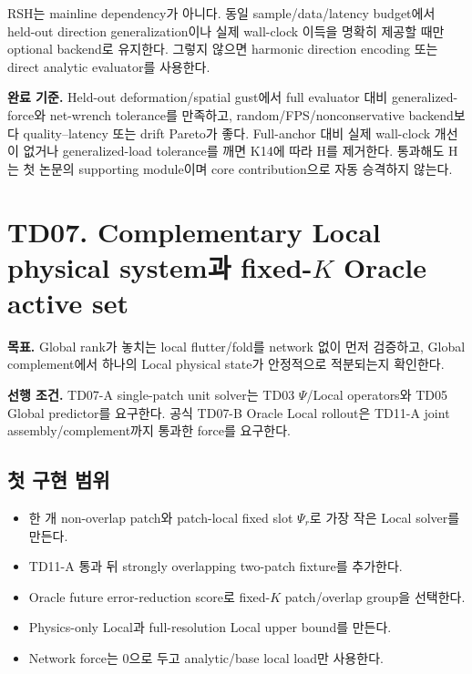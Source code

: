 \documentclass[10pt,a4paper]{article}
\newcommand{\todo}{\textcolor{TodoGray}{\(\square\)}}
\begin{document}
\begin{tcolorbox}[colback=LightOrange,colframe=orange!60!black,title=RSH 결정 규칙,fonttitle=\bfseries]
RSH는 mainline dependency가 아니다. 동일 sample/data/latency budget에서 held-out direction generalization이나
실제 wall-clock 이득을 명확히 제공할 때만 optional backend로 유지한다. 그렇지 않으면 harmonic direction encoding 또는 direct analytic evaluator를 사용한다.
\end{tcolorbox}

\textbf{완료 기준.}
Held-out deformation/spatial gust에서 full evaluator 대비 generalized-force와 net-wrench tolerance를 만족하고,
random/FPS/nonconservative backend보다 quality--latency 또는 drift Pareto가 좋다.
Full-anchor 대비 실제 wall-clock 개선이 없거나 generalized-load tolerance를 깨면 K14에 따라 H를 제거한다.
통과해도 H는 첫 논문의 supporting module이며 core contribution으로 자동 승격하지 않는다.

\section{TD07. Complementary Local physical system과 fixed-\(K\) Oracle active set}

\textbf{목표.}
Global rank가 놓치는 local flutter/fold를 network 없이 먼저 검증하고,
Global complement에서 하나의 Local physical state가 안정적으로 적분되는지 확인한다.

\textbf{선행 조건.}
TD07-A single-patch unit solver는 TD03 \(\Psi\)/Local operators와 TD05 Global predictor를 요구한다.
공식 TD07-B Oracle Local rollout은 TD11-A joint assembly/complement까지 통과한 force를 요구한다.

\subsection*{첫 구현 범위}

\begin{itemize}
  \item[\todo] 한 개 non-overlap patch와 patch-local fixed slot \(\Psi_r\)로 가장 작은 Local solver를 만든다.
  \item[\todo] TD11-A 통과 뒤 strongly overlapping two-patch fixture를 추가한다.
  \item[\todo] Oracle future error-reduction score로 fixed-\(K\) patch/overlap group을 선택한다.
  \item[\todo] Physics-only Local과 full-resolution Local upper bound를 만든다.
  \item[\todo] Network force는 0으로 두고 analytic/base local load만 사용한다.
\end{itemize}
\end{document}

